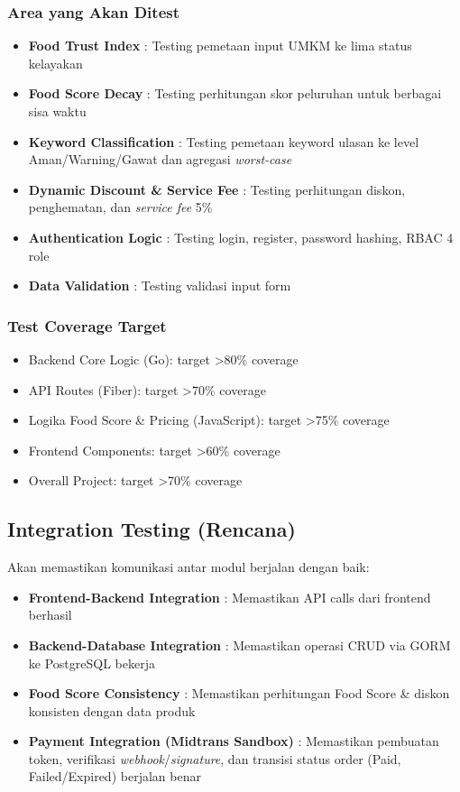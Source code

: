 \subsubsection{Area yang Akan Ditest}
\begin{itemize}[leftmargin=*]
    \item \textbf{Food Trust Index} : Testing pemetaan input UMKM ke lima status kelayakan
    \item \textbf{Food Score Decay} : Testing perhitungan skor peluruhan untuk berbagai sisa waktu
    \item \textbf{Keyword Classification} : Testing pemetaan keyword ulasan ke level Aman/Warning/Gawat dan agregasi \textit{worst-case}
    \item \textbf{Dynamic Discount \& Service Fee} : Testing perhitungan diskon, penghematan, dan \textit{service fee} 5\%
    \item \textbf{Authentication Logic} : Testing login, register, password hashing, RBAC 4 role
    \item \textbf{Data Validation} : Testing validasi input form
\end{itemize}

\subsubsection{Test Coverage Target}
\begin{itemize}[leftmargin=*]
    \item Backend Core Logic (Go): target >80\% coverage
    \item API Routes (Fiber): target >70\% coverage
    \item Logika Food Score \& Pricing (JavaScript): target >75\% coverage
    \item Frontend Components: target >60\% coverage
    \item Overall Project: target >70\% coverage
\end{itemize}

\subsection{Integration Testing (Rencana)}

Akan memastikan komunikasi antar modul berjalan dengan baik:

\begin{itemize}[leftmargin=*]
    \item \textbf{Frontend-Backend Integration} : Memastikan API calls dari frontend berhasil
    \item \textbf{Backend-Database Integration} : Memastikan operasi CRUD via GORM ke PostgreSQL bekerja
    \item \textbf{Food Score Consistency} : Memastikan perhitungan Food Score \& diskon konsisten dengan data produk
    \item \textbf{Payment Integration (Midtrans Sandbox)} : Memastikan pembuatan token, verifikasi \textit{webhook}/\textit{signature}, dan transisi status order (Paid, Failed/Expired) berjalan benar
\end{itemize}

